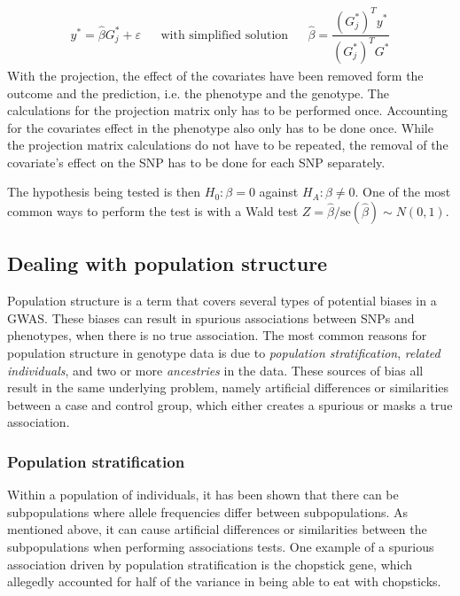 \begin{align}\label{eq:univarGWAS}
y^\ast = \hat{\beta} G_j^{\ast} + \varepsilon&   &\text{with simplified solution}&  &\hat{\beta} = \dfrac{\left( G_j^{\ast} \right)^T y^{\ast}}{\left( G_j^{\ast} \right)^T G^{\ast}}
\end{align}
With the projection, the effect of the covariates have been removed form the outcome and the prediction, i.e. the phenotype and the genotype. The calculations for the projection matrix only has to be performed once. Accounting for the covariates effect in the phenotype also only has to be done once. While the projection matrix calculations do not have to be repeated, the removal of the covariate's effect on the SNP has to be done for each SNP separately.

The hypothesis being tested is then $ H_0: \beta = 0 $ against $ H_A: \beta \neq 0 $. One of the most common ways to perform the test is with a Wald test $ Z = \hat{\beta}/\text{se}(\hat{\beta}) \sim N(0,1)$. 

\subsection{Dealing with population structure}
Population structure is a term that covers several types of potential biases in a GWAS. These biases can result in spurious associations between SNPs and phenotypes, when there is no true association. The most common reasons for population structure in genotype data is due to \textit{population stratification}, \textit{related individuals}, and two or more \textit{ancestries} in the data. These sources of bias all result in the same underlying problem, namely artificial differences or similarities between a case and control group, which either creates a spurious or masks a true association. 

\subsubsection{Population stratification}
Within a population of individuals, it has been shown that there can be subpopulations where allele frequencies differ between subpopulations. As mentioned above, it can cause artificial differences or similarities between the subpopulations when performing associations tests. One example of a spurious association driven by population stratification is the chopstick gene, which allegedly accounted for half of the variance in being able to eat with chopsticks.\cite{marees2018tutorial} 

